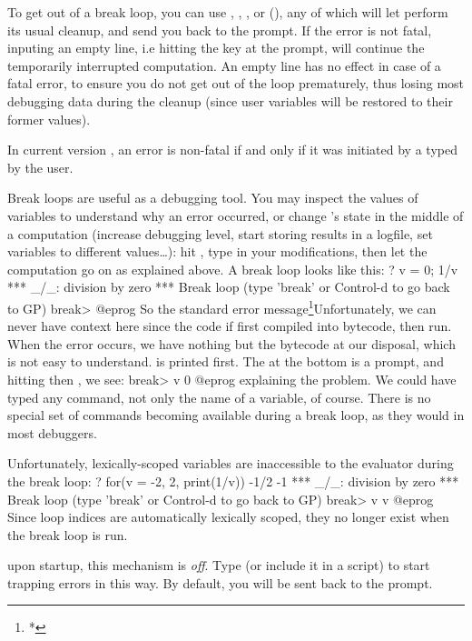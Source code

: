 To get out of a break loop, you can use , ,
, or  (), any of which will let  perform its
usual cleanup, and send you back to the  prompt. If the error is not fatal,
inputing an empty line, i.e hitting the  key at the
 prompt, will continue the temporarily interrupted computation.
An empty line has no effect in case of a fatal error, to ensure you do not
get out of the loop prematurely, thus losing most debugging data during the
cleanup (since user variables will be restored to their former values).

In current version \vers, an error is non-fatal if and only if it was
initiated by a  typed by the user.

Break loops are useful as a debugging tool. You may inspect the values of
 variables to understand why an error occurred, or change
's state in the middle of a computation (increase debugging level,
start storing results in a logfile, set variables to different values\dots):
hit , type in your modifications, then let the computation go on as
explained above. A break loop looks like this:
\bprog
? v = 0; 1/v
  *** _/_: division by zero
  ***   Break loop (type 'break' or Control-d to go back to GP)
break>
@eprog
\noindent So the standard error message\footnote{*}{Unfortunately, we
can never have context here since the code if first compiled into bytecode,
then run. When the error occurs, we have nothing but the bytecode at our
disposal, which is not easy to understand.} is printed first.
The
 at the bottom is a prompt, and hitting  then
, we see:
\bprog
break> v
0
@eprog
\noindent explaining the problem. We could have typed any  command, not
only the name of a variable, of course. There is no special set of commands
becoming available during a break loop, as they would in most debuggers.

Unfortunately, lexically-scoped variables are inaccessible to the evaluator
during the break loop:
\bprog
? for(v = -2, 2, print(1/v))
-1/2
-1
  *** _/_: division by zero
  ***   Break loop (type 'break' or Control-d to go back to GP)
break> v
v
@eprog\noindent
Since loop indices are automatically lexically scoped, they no longer exist
when the break loop is run.

 upon startup, this mechanism is \emph{off}. Type
 (or include it in a script) to start trapping errors in this
way. By default, you will be sent back to the prompt.

